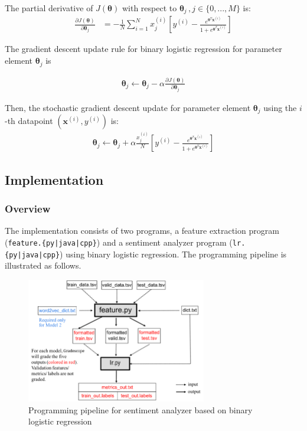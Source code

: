 \documentclass[11pt,addpoints,answers]{exam}
\newcommand{\xv}{\mathbf{x}}
\newcommand{\thetav     }{\boldsymbol \theta     }
\begin{document}
The partial derivative of $J(\thetav)$ with respect to $\thetav_j \,, j\in\{0,...,M\}$ is:
\begin{align}
    \frac{\partial J(\thetav)}{\partial \thetav_j} &= -\frac{1}{N} \sum_{i=1}^N x_j^{\left(i\right)}\left[y^{(i)}-\frac{e^{\thetav^T\xv^{\left(i\right)}}}{1+e^{\thetav^T\xv^{\left(i\right)}}}\right]
\end{align}


The gradient descent update rule  for binary logistic regression for parameter element $\thetav_j$ is

\begin{align}
    \thetav_j \leftarrow \thetav_j - \alpha \frac{\partial J(\thetav)}{\partial \thetav_j}
\end{align}


Then, the stochastic gradient descent update for  parameter element $\thetav_j$ using the $i$-th datapoint $(\xv^{(i)},y^{(i)})$ is:
\begin{align}
    \thetav_j \leftarrow \thetav_j + \alpha \frac{x_j^{\left(i\right)}}{N} \left[y^{(i)}-\frac{e^{\thetav^T\xv^{\left(i\right)}}}{1+e^{\thetav^T\xv^{\left(i\right)}}}\right]
\end{align}
 


\subsection{Implementation}

\subsubsection{Overview}\label{overview}

The implementation consists of two programs, a feature extraction program (\texttt{feature.\{py|java|cpp\}}) and a sentiment analyzer program (\texttt{lr.\{py|java|cpp\}}) using binary logistic regression. The programming pipeline is illustrated as follows.

\begin{figure}[H]
        \centering
        \includegraphics[width = 0.7\textwidth]{Pipeline_v2.png}
        \caption{Programming pipeline for sentiment analyzer based on binary logistic regression}
        \label{pipeline}
\end{figure}
\end{document}
